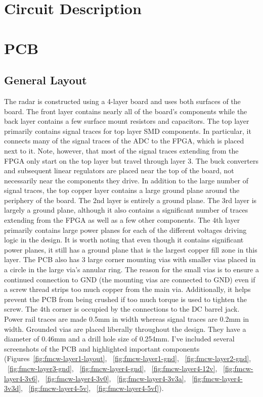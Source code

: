 \documentclass{default}
\begin{document}
\tableofcontents
\hypersetup{linkcolor=red}

\chapter{Circuit Description}
\label{cha:circuit}











\chapter{PCB}
\section{General Layout}

The radar is constructed using a 4-layer board and uses both surfaces of the board. The front layer
contains nearly all of the board's components while the back layer contains a few surface mount
resistors and capacitors. The top layer primarily contains signal traces for top layer SMD
components. In particular, it connects many of the signal traces of the ADC to the FPGA, which is
placed next to it. Note, however, that most of the signal traces extending from the FPGA only start
on the top layer but travel through layer 3. The buck converters and subsequent linear regulators
are placed near the top of the board, not necessarily near the components they drive. In addition to
the large number of signal traces, the top copper layer contains a large ground plane around the
periphery of the board. The 2nd layer is entirely a ground plane. The 3rd layer is largely a ground
plane, although it also contains a significant number of traces extending from the FPGA as well as a
few other components. The 4th layer primarily contains large power planes for each of the different
voltages driving logic in the design. It is worth noting that even though it contains significant
power planes, it still has a ground plane that is the largest copper fill zone in this layer. The
PCB also has 3 large corner mounting vias with smaller vias placed in a circle in the large via's
annular ring. The reason for the small vias is to ensure a continued connection to GND (the mounting
vias are connected to GND) even if a screw thread strips too much copper from the main
via. Additionally, it helps prevent the PCB from being crushed if too much torque is used to tighten
the screw. The 4th corner is occupied by the connections to the DC barrel jack. Power rail traces
are made 0.5mm in width whereas signal traces are 0.2mm in width. Grounded vias are placed liberally
throughout the design. They have a diameter of 0.46mm and a drill hole size of 0.254mm. I've
included several screenshots of the PCB and highlighted important components
(Figures~\ref{fig:fmcw-layer1-layout}, ~\ref{fig:fmcw-layer1-gnd}, ~\ref{fig:fmcw-layer2-gnd},
~\ref{fig:fmcw-layer3-gnd}, ~\ref{fig:fmcw-layer4-gnd}, ~\ref{fig:fmcw-layer4-12v},
~\ref{fig:fmcw-layer4-3v6}, ~\ref{fig:fmcw-layer4-3v0}, ~\ref{fig:fmcw-layer4-3v3a},
~\ref{fig:fmcw-layer4-3v3d}, ~\ref{fig:fmcw-layer4-5v}, ~\ref{fig:fmcw-layer4-5vf}).
\end{document}

